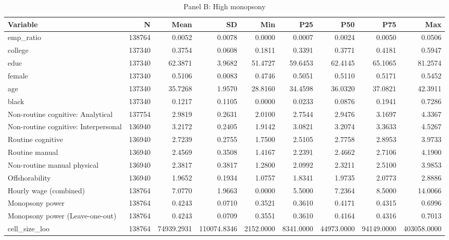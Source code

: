 \begin{table}

\caption{Panel B: High monopsony}
\centering
\begin{tabular}[t]{lrrrrrrrr}
\toprule
Variable & N & Mean & SD & Min & P25 & P50 & P75 & Max\\
\midrule
emp\_ratio & 138764 & 0.0052 & 0.0078 & 0.0000 & 0.0007 & 0.0024 & 0.0050 & 0.0506\\
college & 137340 & 0.3754 & 0.0608 & 0.1811 & 0.3391 & 0.3771 & 0.4181 & 0.5947\\
educ & 137340 & 62.3871 & 3.9682 & 51.4727 & 59.6453 & 62.4145 & 65.1065 & 81.2574\\
female & 137340 & 0.5106 & 0.0083 & 0.4746 & 0.5051 & 0.5110 & 0.5171 & 0.5452\\
age & 137340 & 35.7268 & 1.9570 & 28.8160 & 34.4598 & 36.0320 & 37.0821 & 42.3911\\
\addlinespace
black & 137340 & 0.1217 & 0.1105 & 0.0000 & 0.0233 & 0.0876 & 0.1941 & 0.7286\\
Non-routine cognitive: Analytical & 137754 & 2.9819 & 0.2631 & 2.0100 & 2.7544 & 2.9476 & 3.1697 & 4.3367\\
Non-routine cognitive: Interpersonal & 136940 & 3.2172 & 0.2405 & 1.9142 & 3.0821 & 3.2074 & 3.3633 & 4.5267\\
Routine cognitive & 136940 & 2.7239 & 0.2755 & 1.7500 & 2.5105 & 2.7758 & 2.8953 & 3.9733\\
Routine manual & 136940 & 2.4569 & 0.3508 & 1.4167 & 2.2391 & 2.4662 & 2.7106 & 4.1900\\
\addlinespace
Non-routine manual physical & 136940 & 2.3817 & 0.3817 & 1.2800 & 2.0992 & 2.3211 & 2.5100 & 3.9853\\
Offshorability & 136940 & 1.9652 & 0.1934 & 1.0757 & 1.8341 & 1.9735 & 2.0773 & 2.8886\\
Hourly wage (combined) & 138764 & 7.0770 & 1.9663 & 0.0000 & 5.5000 & 7.2364 & 8.5000 & 14.0066\\
Monopsony power & 138764 & 0.4243 & 0.0710 & 0.3521 & 0.3610 & 0.4171 & 0.4315 & 0.6996\\
Monopsony power (Leave-one-out) & 138764 & 0.4243 & 0.0709 & 0.3551 & 0.3610 & 0.4164 & 0.4316 & 0.7013\\
\addlinespace
cell\_size\_loo & 138764 & 74939.2931 & 110074.8346 & 2152.0000 & 8341.0000 & 44973.0000 & 94149.0000 & 403058.0000\\
\bottomrule
\end{tabular}
\end{table}
